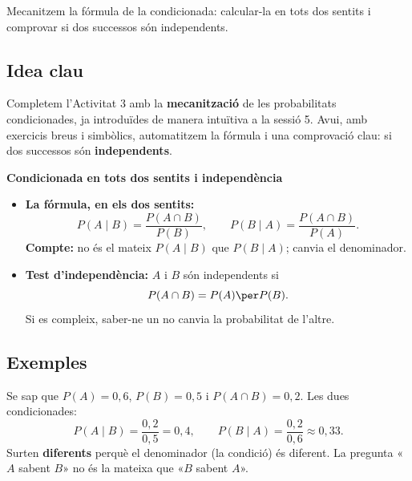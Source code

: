 %
{Mecanitzem la fórmula de la condicionada: calcular-la en tots dos sentits i comprovar si dos successos són independents.}

\subsection{Idea clau}

Completem l'Activitat 3 amb la \textbf{mecanització} de les probabilitats
condicionades, ja introduïdes de manera intuïtiva a la sessió 5. Avui, amb exercicis
breus i simbòlics, automatitzem la fórmula i una comprovació clau: si dos successos són
\textbf{independents}.

\begin{idea}
\textbf{Condicionada en tots dos sentits i independència}
\begin{itemize}[leftmargin=1.4em, itemsep=3pt]
  \item \textbf{La fórmula, en els dos sentits:}
        \[
        P(A\mid B)=\frac{P(A\cap B)}{P(B)},\qquad
        P(B\mid A)=\frac{P(A\cap B)}{P(A)}.
        \]
        \textbf{Compte:} no és el mateix $P(A\mid B)$ que $P(B\mid A)$; canvia el
        denominador.
  \item \textbf{Test d'independència:} $A$ i $B$ són independents si
        \[
        P(A\cap B)=P(A)\per P(B).
        \]
        Si es compleix, saber-ne un no canvia la probabilitat de l'altre.
\end{itemize}
\end{idea}

\subsection{Exemples}

\begin{exemple}
Se sap que $P(A)=0,6$, $P(B)=0,5$ i $P(A\cap B)=0,2$. Les dues condicionades:
\[
P(A\mid B)=\frac{0,2}{0,5}=0,4,\qquad
P(B\mid A)=\frac{0,2}{0,6}\approx 0,33.
\]
Surten \textbf{diferents} perquè el denominador (la condició) és diferent. La pregunta
«$A$ sabent $B$» no és la mateixa que «$B$ sabent $A$».
\end{exemple}

